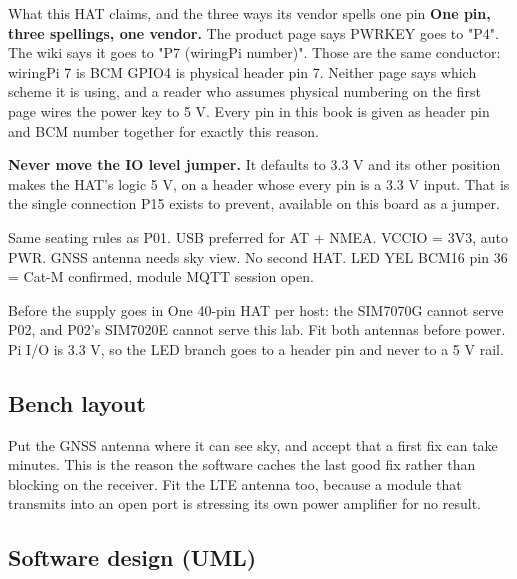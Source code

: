 \begin{note}{What this HAT claims, and the three ways its vendor spells one pin}
\textbf{One pin, three spellings, one vendor.} The product page says PWRKEY goes to "P4". The wiki says it goes to "P7 (wiringPi number)". Those are the same conductor: wiringPi 7 is BCM GPIO4 is physical header pin 7. Neither page says which scheme it is using, and a reader who assumes physical numbering on the first page wires the power key to 5 V. Every pin in this book is given as header pin and BCM number together for exactly this reason.

\textbf{Never move the IO level jumper.} It defaults to 3.3 V and its other position makes the HAT's logic 5 V, on a header whose every pin is a 3.3 V input. That is the single connection P15 exists to prevent, available on this board as a jumper.
\end{note}

\begin{asciiart}
Same seating rules as P01. USB preferred for AT + NMEA.
VCCIO = 3V3, auto PWR.
GNSS antenna needs sky view.
No second HAT.
LED YEL BCM16 pin 36 = Cat-M confirmed, module MQTT session open.
\end{asciiart}

\begin{rulebox}{Before the supply goes in}
One 40-pin HAT per host: the SIM7070G cannot serve P02, and P02's SIM7020E cannot serve this lab. Fit both antennas before power. Pi I/O is 3.3 V, so the LED branch goes to a header pin and never to a 5 V rail.
\end{rulebox}

\subsection*{Bench layout}


Put the GNSS antenna where it can see sky, and accept that a first fix can take minutes. This is the reason the software caches the last good fix rather than blocking on the receiver. Fit the LTE antenna too, because a module that transmits into an open port is stressing its own power amplifier for no result.

\subsection*{Software design (UML)}


